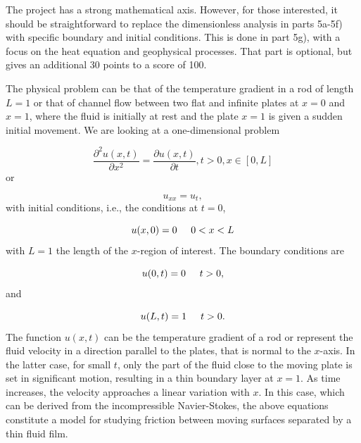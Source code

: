 \documentclass[%
oneside,                 %
final,                   %
10pt]{article}
\begin{document}
The project has a strong mathematical axis. However, for those interested, it should be straightforward to replace the dimensionless analysis in  parts 5a-5f) with specific boundary and initial conditions. This is done in part 5g), with a focus on the heat equation and geophysical processes. That part is optional, but gives an additional 30 points to a score of 100.

The physical problem can be that of the temperature gradient in a rod of length $L=1$ or that of channel flow
between two flat and infinite plates at $x=0$ and $x=1$, where the fluid is initially at rest
and the plate $x=1$ is given a sudden initial movement.  We are looking at a one-dimensional
problem

\begin{equation*}
 \frac{\partial^2 u(x,t)}{\partial x^2} =\frac{\partial u(x,t)}{\partial t}, t> 0, x\in [0,L]
\end{equation*}
or

\begin{equation*}
u_{xx} = u_t,
\end{equation*}
with initial conditions, i.e., the conditions at $t=0$,

\begin{equation*}
u(x,0)= 0 \hspace{0.5cm} 0 < x < L
\end{equation*}
with $L=1$ the length of the $x$-region of interest. The 
boundary conditions are

\begin{equation*}
u(0,t)= 0 \hspace{0.5cm} t > 0,
\end{equation*}
and

\begin{equation*}
u(L,t)= 1 \hspace{0.5cm} t > 0.
\end{equation*}
The function $u(x,t)$  can be the temperature gradient of a  rod or represent the fluid velocity 
in a direction parallel to the plates, that is normal to the $x$-axis. In the latter case, 
for small $t$, only the part of the fluid
close to the moving plate is set in significant  motion, resulting in a thin boundary layer at $x=1$. 
As time increases, the velocity approaches a linear variation with $x$. In this case, which can be derived
from the incompressible Navier-Stokes, the above equations constitute a model for  
studying friction between moving surfaces separated by a thin fluid film.
\end{document}
